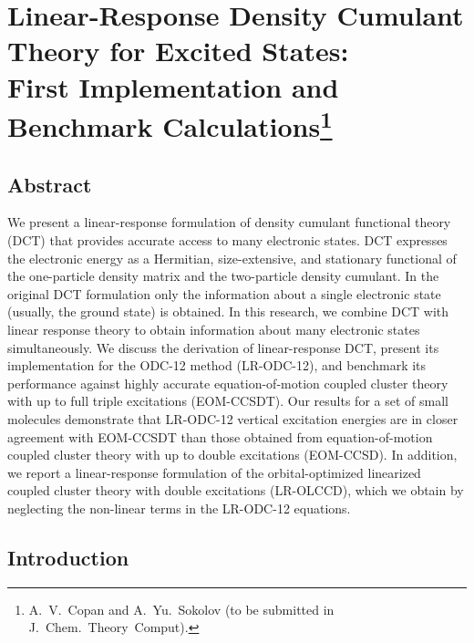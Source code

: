\chapter[%
    Linear-Response Density Cumulant Theory for Excited States:\\
	First Implementation and Benchmark Calculations
]{%
    Linear-Response Density Cumulant Theory for Excited States:\\
	First Implementation and Benchmark Calculations\footnote{%
        A.~V.~Copan and A.~Yu.~Sokolov (to be submitted in
        J.~Chem.~Theory~Comput).
    }
}
\label{ch:response}


\section{Abstract}

We present a linear-response formulation of density cumulant functional theory
(DCT) that provides accurate access to many electronic states.
DCT expresses the electronic energy as a Hermitian, size-extensive, and
stationary functional of the one-particle density matrix and the two-particle
density cumulant.
In the original DCT formulation only the information about a single electronic
state (usually, the ground state) is obtained.
In this research, we combine DCT with linear response theory to obtain
information about many electronic states simultaneously.
We discuss the derivation of linear-response DCT, present its implementation for
the ODC-12 method (LR-ODC-12), and benchmark its performance against highly
accurate equation-of-motion coupled cluster theory with up to full triple
excitations (EOM-CCSDT).
Our results for a set of small molecules demonstrate that LR-ODC-12 vertical
excitation energies are in closer agreement with EOM-CCSDT than those obtained
from equation-of-motion coupled cluster theory with up to double excitations
(EOM-CCSD).
In addition, we report a linear-response formulation of the orbital-optimized
linearized coupled cluster theory with double excitations (LR-OLCCD), which we
obtain by neglecting the non-linear terms in the LR-ODC-12 equations.


\section{Introduction}

